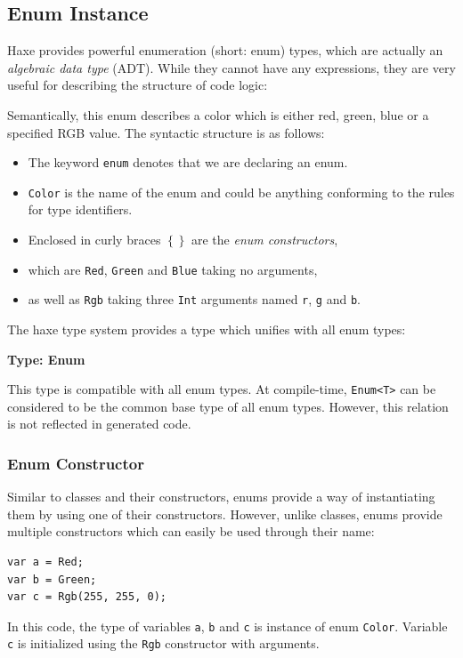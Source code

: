 \documentclass{article}
\newcommand{\type}[1]{\texttt{#1}}
\newcommand{\expr}[1]{\texttt{#1}}
\newenvironment{myshaded}
  {\def\FrameCommand{\fboxsep=\topsep\colorbox{bgcolor}}%
  \MakeFramed {\advance\hsize-\width \FrameRestore}}%
 {\endMakeFramed}
\newcommand{\define}[3][Definition]
	{\begin{myshaded}\noindent\textbf{#1: #2}\par\nobreak\noindent\ignorespaces#3\label{def:#2}\end{myshaded}}
\begin{document}
\subsection{Enum Instance}
\label{Enum Instance}

Haxe provides powerful enumeration (short: enum) types, which are actually an \emph{algebraic data type} (ADT). While they cannot have any expressions, they are very useful for describing the structure of code logic:


Semantically, this enum describes a color which is either red, green, blue or a specified RGB value. The syntactic structure is as follows:
\begin{itemize}
	\item The keyword \expr{enum} denotes that we are declaring an enum.
	\item \type{Color} is the name of the enum and could be anything conforming to the rules for type identifiers.
	\item Enclosed in curly braces \expr{$\left\{\right\}$} are the \emph{enum constructors},
	\item which are \expr{Red}, \expr{Green} and \expr{Blue} taking no arguments,
	\item as well as \expr{Rgb} taking three \type{Int} arguments named \expr{r}, \expr{g} and \expr{b}.
\end{itemize}
The haxe type system provides a type which unifies with all enum types:

\define[Type]{Enum}{This type is compatible with all enum types. At compile-time, \type{Enum<T>} can be considered to be the common base type of all enum types. However, this relation is not reflected in generated code.} 

\subsubsection{Enum Constructor}
\label{Enum Constructor}

Similar to classes and their constructors, enums provide a way of instantiating them by using one of their constructors. However, unlike classes, enums provide multiple constructors which can easily be used through their name:

\begin{lstlisting}
var a = Red;
var b = Green;
var c = Rgb(255, 255, 0);
\end{lstlisting}
In this code, the type of variables \expr{a}, \expr{b} and \expr{c} is instance of enum \type{Color}. Variable \expr{c} is initialized using the \expr{Rgb} constructor with arguments.
\end{document}
